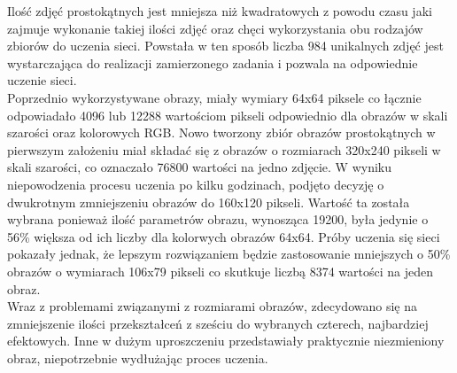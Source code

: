 Ilość zdjęć prostokątnych jest mniejsza niż kwadratowych z powodu czasu jaki zajmuje
wykonanie takiej ilości zdjęć oraz chęci wykorzystania obu rodzajów zbiorów do uczenia sieci.
Powstała w ten sposób liczba 984 unikalnych zdjęć jest wystarczająca do realizacji
zamierzonego zadania i pozwala na odpowiednie uczenie sieci. \\
Poprzednio wykorzystywane obrazy, miały wymiary 64x64 piksele co łącznie odpowiadało
4096 lub 12288 wartościom pikseli odpowiednio dla obrazów w skali szarości oraz
kolorowych RGB. Nowo tworzony zbiór obrazów prostokątnych w pierwszym założeniu miał
składać się z obrazów o rozmiarach 320x240 pikseli w skali szarości, co oznaczało
76800 wartości na jedno zdjęcie. W wyniku niepowodzenia procesu uczenia po kilku godzinach,
podjęto decyzję o dwukrotnym zmniejszeniu obrazów do 160x120 pikseli. Wartość ta
została wybrana ponieważ ilość parametrów obrazu, wynosząca 19200, była jedynie o 56\%
większa od ich liczby dla kolorwych obrazów 64x64. Próby uczenia się sieci pokazały jednak,
że lepszym rozwiązaniem będzie zastosowanie mniejszych o 50\% obrazów o wymiarach
106x79 pikseli co skutkuje liczbą 8374 wartości na jeden obraz. \\
Wraz z problemami związanymi z rozmiarami obrazów, zdecydowano się na zmniejszenie ilości
przekształceń z sześciu do wybranych czterech, najbardziej efektowych. Inne w dużym
uproszczeniu przedstawiały praktycznie niezmieniony obraz, niepotrzebnie wydłużając proces
uczenia.
